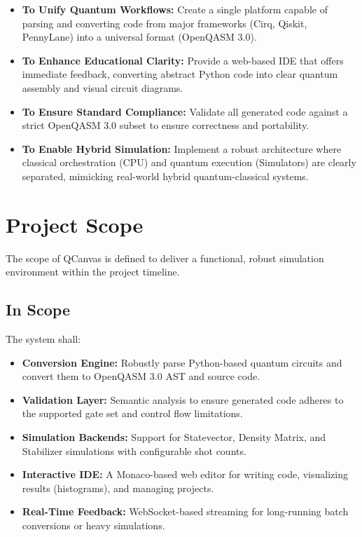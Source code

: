 \begin{itemize}
    \item \textbf{To Unify Quantum Workflows:} Create a single platform capable of parsing and converting code from major frameworks (Cirq, Qiskit, PennyLane) into a universal format (OpenQASM 3.0).
    \item \textbf{To Enhance Educational Clarity:} Provide a web-based IDE that offers immediate feedback, converting abstract Python code into clear quantum assembly and visual circuit diagrams.
    \item \textbf{To Ensure Standard Compliance:} Validate all generated code against a strict OpenQASM 3.0 subset to ensure correctness and portability.
    \item \textbf{To Enable Hybrid Simulation:} Implement a robust architecture where classical orchestration (CPU) and quantum execution (Simulators) are clearly separated, mimicking real-world hybrid quantum-classical systems.
\end{itemize}

\section{Project Scope}

The scope of QCanvas is defined to deliver a functional, robust simulation environment within the project timeline.

\subsection{In Scope}

The system shall:
\begin{itemize}
    \item \textbf{Conversion Engine:} Robustly parse Python-based quantum circuits and convert them to OpenQASM 3.0 AST and source code.
    \item \textbf{Validation Layer:} Semantic analysis to ensure generated code adheres to the supported gate set and control flow limitations.
    \item \textbf{Simulation Backends:} Support for Statevector, Density Matrix, and Stabilizer simulations with configurable shot counts.
    \item \textbf{Interactive IDE:} A Monaco-based web editor for writing code, visualizing results (histograms), and managing projects.
    \item \textbf{Real-Time Feedback:} WebSocket-based streaming for long-running batch conversions or heavy simulations.
\end{itemize}

